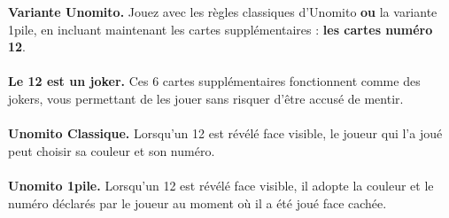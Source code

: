 \documentclass[a4paper]{memoir}
\begin{document}
{\footnotesize

\noindent
\textbf{ Variante Unomito.} Jouez avec les règles classiques d'Unomito \textbf{ou} la variante 1pile, en incluant maintenant les cartes supplémentaires : \textbf{les cartes numéro 12}.
\\
\\
\noindent
\textbf{ Le 12 est un joker.} Ces 6 cartes supplémentaires fonctionnent comme des jokers, vous permettant de les jouer sans risquer d'être accusé de mentir.
\\
\\
\noindent
\textbf{ Unomito Classique.} Lorsqu'un 12 est révélé face visible, le joueur qui l'a joué peut choisir sa couleur et son numéro.
\\
\\
\noindent
\textbf{ Unomito 1pile.} Lorsqu'un 12 est révélé face visible, il adopte la couleur et le numéro déclarés par le joueur au moment où il a été joué face cachée.
}
\end{document}
